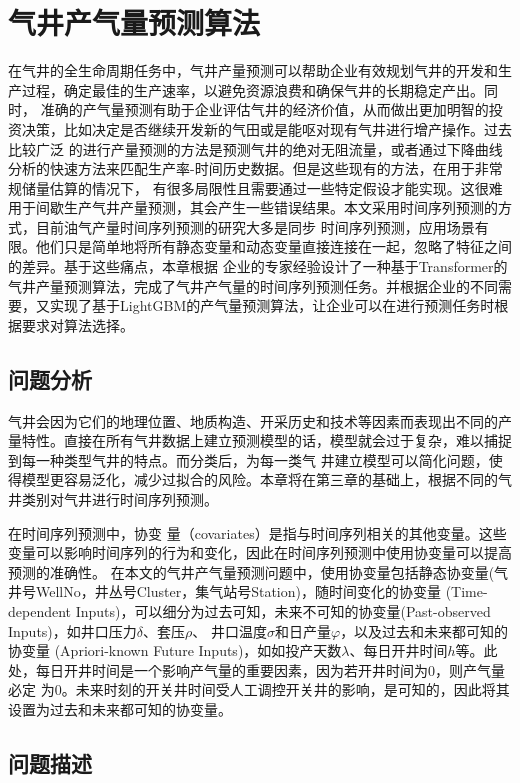 \chapter{气井产气量预测算法}
在气井的全生命周期任务中，气井产量预测可以帮助企业有效规划气井的开发和生产过程，确定最佳的生产速率，以避免资源浪费和确保气井的长期稳定产出。同时，
准确的产气量预测有助于企业评估气井的经济价值，从而做出更加明智的投资决策，比如决定是否继续开发新的气田或是能呕对现有气井进行增产操作。过去比较广泛
的进行产量预测的方法是预测气井的绝对无阻流量，或者通过下降曲线分析的快速方法来匹配生产率-时间历史数据。但是这些现有的方法，在用于非常规储量估算的情况下，
有很多局限性且需要通过一些特定假设才能实现。这很难用于间歇生产气井产量预测，其会产生一些错误结果。本文采用时间序列预测的方式，目前油气产量时间序列预测的研究大多是同步
时间序列预测，应用场景有限。他们只是简单地将所有静态变量和动态变量直接连接在一起，忽略了特征之间的差异。基于这些痛点，本章根据
企业的专家经验设计了一种基于Transformer的气井产量预测算法，完成了气井产气量的时间序列预测任务。并根据企业的不同需要，又实现了基于LightGBM的产气量预测算法，让企业可以在进行预测任务时根据要求对算法选择。
\section{问题分析}
气井会因为它们的地理位置、地质构造、开采历史和技术等因素而表现出不同的产量特性。直接在所有气井数据上建立预测模型的话，模型就会过于复杂，难以捕捉到每一种类型气井的特点。而分类后，为每一类气
井建立模型可以简化问题，使得模型更容易泛化，减少过拟合的风险。本章将在第三章的基础上，根据不同的气井类别对气井进行时间序列预测。

在时间序列预测中，协变
量（covariates）是指与时间序列相关的其他变量。这些变量可以影响时间序列的行为和变化，因此在时间序列预测中使用协变量可以提高预测的准确性。
在本文的气井产气量预测问题中，使用协变量包括静态协变量(气井号WellNo，井丛号Cluster，集气站号Station)，随时间变化的协变量
(Time-dependent Inputs)，可以细分为过去可知，未来不可知的协变量(Past-observed Inputs)，如井口压力\( \delta \)、套压\( \rho \)、
井口温度\( \sigma \)和日产量$\varphi $，以及过去和未来都可知的协变量
(Apriori-known Future Inputs)，如如投产天数\( \lambda  \)、每日开井时间$h$等。此处，每日开井时间是一个影响产气量的重要因素，因为若开井时间为0，则产气量必定
为0。未来时刻的开关井时间受人工调控开关井的影响，是可知的，因此将其设置为过去和未来都可知的协变量。
\section{问题描述}
